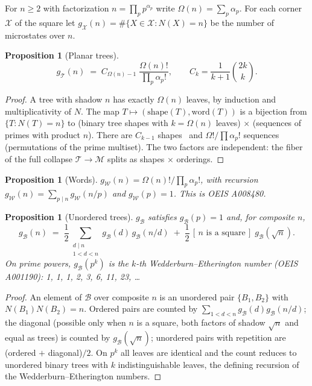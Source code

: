 \documentclass[11pt]{article}
\newcommand{\cT}{\mathcal{T}}   %
\newcommand{\cW}{\mathcal{W}}   %
\newcommand{\cB}{\mathcal{B}}   %
\newcommand{\cM}{\mathcal{M}}   %
\numberwithin{equation}{section}
\theoremstyle{plain}
\newtheorem{proposition}[theorem]{Proposition}
\theoremstyle{definition}
\theoremstyle{remark}
\begin{document}
For $n \ge 2$ with factorization $n = \prod_p p^{\alpha_p}$ write
$\Omega(n) = \sum_p \alpha_p$. For each corner $\mathcal{X}$ of the square let
$g_{\mathcal X}(n) = \#\{X \in \mathcal{X} : N(X) = n\}$ be the number of microstates
over $n$.

\begin{proposition}[Planar trees]\label{prop:gT}
\[
g_\cT(n) \;=\; C_{\Omega(n)-1}\;\frac{\Omega(n)!}{\prod_p \alpha_p!},
\qquad C_k = \frac{1}{k+1}\binom{2k}{k}.
\]
\end{proposition}

\begin{proof}
A tree with shadow $n$ has exactly $\Omega(n)$ leaves, by induction and multiplicativity
of $N$. The map $T \mapsto (\text{shape}(T), \mathrm{word}(T))$ is a bijection from
$\{T : N(T)=n\}$ to (binary tree shapes with $k=\Omega(n)$ leaves) $\times$ (sequences
of primes with product $n$). There are $C_{k-1}$ shapes~\cite{stanley} and
$\Omega!/\prod \alpha_p!$ sequences (permutations of the prime multiset). The two
factors are independent: the fiber of the full collapse $\cT \to \cM$ splits as
shapes $\times$ orderings.
\end{proof}

\begin{proposition}[Words]\label{prop:gW}
$g_\cW(n) = \Omega(n)!/\prod_p \alpha_p!$, with recursion
$g_\cW(n) = \sum_{p \mid n} g_\cW(n/p)$ and $g_\cW(p)=1$. This is OEIS A008480.
\end{proposition}

\begin{proposition}[Unordered trees]\label{prop:gB}
$g_\cB$ satisfies $g_\cB(p) = 1$ and, for composite $n$,
\[
g_\cB(n) \;=\; \frac12 \sum_{\substack{d \mid n \\ 1<d<n}} g_\cB(d)\, g_\cB(n/d)
\;+\; \frac12\,[\,n \text{ is a square}\,]\; g_\cB(\sqrt n).
\]
On prime powers, $g_\cB(p^k)$ is the $k$-th Wedderburn--Etherington number
(OEIS A001190): 1, 1, 1, 2, 3, 6, 11, 23, \dots
\end{proposition}

\begin{proof}
An element of $\cB$ over composite $n$ is an unordered pair $\{B_1,B_2\}$ with
$N(B_1)N(B_2) = n$. Ordered pairs are counted by $\sum_{1<d<n} g_\cB(d)g_\cB(n/d)$; the
diagonal (possible only when $n$ is a square, both factors of shadow $\sqrt n$ and equal
as trees) is counted by $g_\cB(\sqrt n)$; unordered pairs with repetition are (ordered
$+$ diagonal)$/2$. On $p^k$ all leaves are identical and the count reduces to
unordered binary trees with $k$ indistinguishable leaves, the defining recursion of the
Wedderburn--Etherington numbers.
\end{proof}
\end{document}
